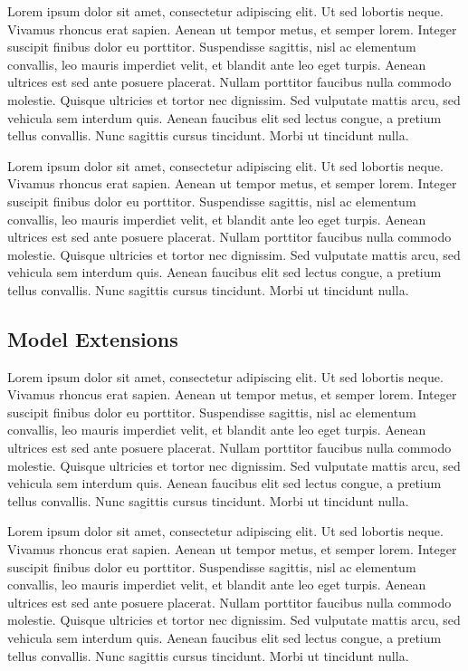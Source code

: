 Lorem ipsum dolor sit amet, consectetur adipiscing elit. Ut sed lobortis neque. Vivamus rhoncus erat sapien. Aenean ut tempor metus, et semper lorem. Integer suscipit finibus dolor eu porttitor. Suspendisse sagittis, nisl ac elementum convallis, leo mauris imperdiet velit, et blandit ante leo eget turpis. Aenean ultrices est sed ante posuere placerat. Nullam porttitor faucibus nulla commodo molestie. Quisque ultricies et tortor nec dignissim. Sed vulputate mattis arcu, sed vehicula sem interdum quis. Aenean faucibus elit sed lectus congue, a pretium tellus convallis. Nunc sagittis cursus tincidunt. Morbi ut tincidunt nulla.

Lorem ipsum dolor sit amet, consectetur adipiscing elit. Ut sed lobortis neque. Vivamus rhoncus erat sapien. Aenean ut tempor metus, et semper lorem. Integer suscipit finibus dolor eu porttitor. Suspendisse sagittis, nisl ac elementum convallis, leo mauris imperdiet velit, et blandit ante leo eget turpis. Aenean ultrices est sed ante posuere placerat. Nullam porttitor faucibus nulla commodo molestie. Quisque ultricies et tortor nec dignissim. Sed vulputate mattis arcu, sed vehicula sem interdum quis. Aenean faucibus elit sed lectus congue, a pretium tellus convallis. Nunc sagittis cursus tincidunt. Morbi ut tincidunt nulla.

\subsection{Model Extensions}
Lorem ipsum dolor sit amet, consectetur adipiscing elit. Ut sed lobortis neque. Vivamus rhoncus erat sapien. Aenean ut tempor metus, et semper lorem. Integer suscipit finibus dolor eu porttitor. Suspendisse sagittis, nisl ac elementum convallis, leo mauris imperdiet velit, et blandit ante leo eget turpis. Aenean ultrices est sed ante posuere placerat. Nullam porttitor faucibus nulla commodo molestie. Quisque ultricies et tortor nec dignissim. Sed vulputate mattis arcu, sed vehicula sem interdum quis. Aenean faucibus elit sed lectus congue, a pretium tellus convallis. Nunc sagittis cursus tincidunt. Morbi ut tincidunt nulla.

Lorem ipsum dolor sit amet, consectetur adipiscing elit. Ut sed lobortis neque. Vivamus rhoncus erat sapien. Aenean ut tempor metus, et semper lorem. Integer suscipit finibus dolor eu porttitor. Suspendisse sagittis, nisl ac elementum convallis, leo mauris imperdiet velit, et blandit ante leo eget turpis. Aenean ultrices est sed ante posuere placerat. Nullam porttitor faucibus nulla commodo molestie. Quisque ultricies et tortor nec dignissim. Sed vulputate mattis arcu, sed vehicula sem interdum quis. Aenean faucibus elit sed lectus congue, a pretium tellus convallis. Nunc sagittis cursus tincidunt. Morbi ut tincidunt nulla.
